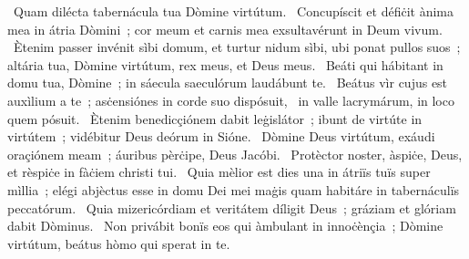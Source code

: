 ~Quam dilécta tabernácula tua Dòmine virtútum. 
~Concupíscit et défiċit ànima mea in átria Dòmini~; cor meum et carnis mea exsultavérunt in Deum vivum. 
~Ètenim passer invénit sìbi domum, et turtur nidum sìbi, ubi ponat pullos suos~; altária tua, Dòmine virtútum, rex meus, et Deus meus. 
~Beáti qui hábitant in domu tua, Dòmine~; in sáecula saeculórum laudábunt te. 
~Beátus vìr cujus est auxìlium a te~; asċensiónes in corde suo dispósuit, 
~in valle lacrymárum, in loco quem pósuit. 
~Ètenim benedicçiónem dabit leġislátor~; ibunt de virtúte in virtútem~; vidébitur Deus deórum in Sióne. 
~Dòmine Deus virtútum, exáudi oraçiónem meam~; áuribus pèrċipe, Deus Jacóbi. 
~Protèctor noster, àspiċe, Deus, et rèspiċe in fàċiem christi tui. 
~Quia mèlior est dies una in átriïs tuïs super mìllia~; elégi abjèctus esse in domu Dei mei maġis quam habitáre in tabernáculïs peccatórum. 
~Quia mizericórdiam et veritátem díligit Deus~; gráziam et glóriam dabit Dòminus. 
~Non privábit bonïs eos qui àmbulant in innoċènçia~; Dòmine virtútum, beátus hòmo qui sperat in te. 
